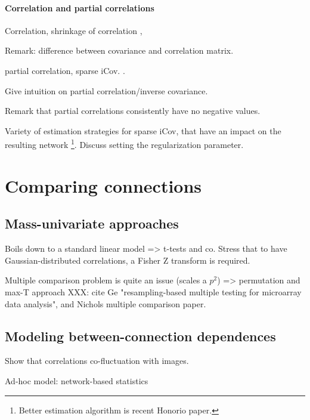 \documentclass[5p]{elsarticle}
\begin{document}
\paragraph{Correlation and partial correlations}

Correlation, shrinkage of correlation \cite{ledoit2004,varoquaux2012},

Remark: difference between covariance and correlation matrix.

partial correlation, sparse iCov. \cite{smith2011,varoquaux2010b}. 

Give intuition on partial correlation/inverse covariance.

Remark that partial correlations consistently have no negative values.

Variety
of estimation strategies for sparse iCov, that have an impact on the
resulting network \cite{varoquaux2012}\footnote{Better estimation
algorithm is recent Honorio paper.}. Discuss setting the regularization
parameter.


\section{Comparing connections}

\subsection{Mass-univariate approaches}

Boils down to a standard linear model => t-tests and co.
Stress that to have Gaussian-distributed correlations, a Fisher Z
transform is required.

Multiple comparison problem is quite an issue (scales a $p^2$) =>
permutation and max-T approach XXX: cite Ge
"resampling-based multiple testing for microarray data analysis", and
Nichols multiple comparison paper.

\subsection{Modeling between-connection dependences}

Show that correlations co-fluctuation with images.

Ad-hoc model: network-based statistics \cite{zalesky2010}
\end{document}
